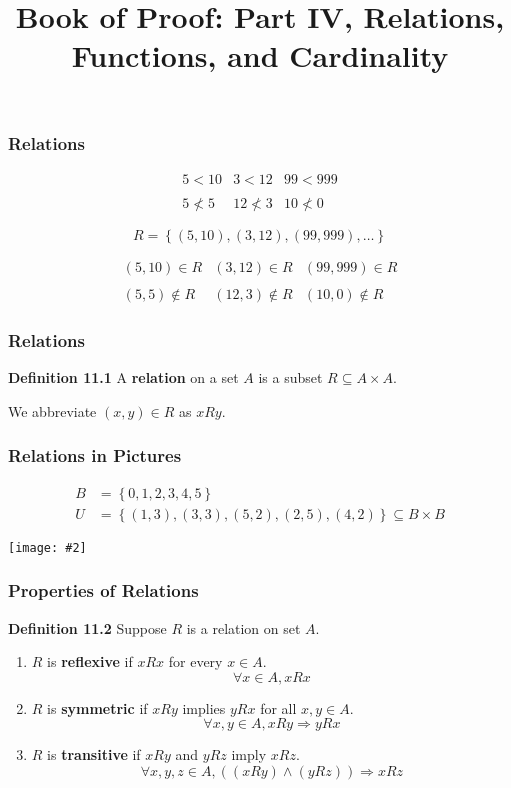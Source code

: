 \documentclass{beamer}
\title{Book of Proof: Part IV, Relations, Functions, and Cardinality}
\newcommand{\set}[1]{\ensuremath{\left\{ #1 \right\}}}
\newcommand{\then}{\ensuremath{\Rightarrow}}
\newcommand{\grf}[2]{\centerline{\texttt{[image: \#2]}}}
\newcommand{\bfr}[1]{\begin{frame}[fragile]\frametitle{{ #1 }}}
\begin{document}
\begin{frame}
\maketitle

\end{frame}

\bfr{Relations}
\[
\begin{array}{ccc}
  5 < 10 & 3 < 12 & 99 < 999 \\\\
  5 \not< 5 & 12\not< 3 & 10 \not< 0
\end{array}
\]

\pause\vfill
\[ R = \set{(5,10), (3,12), (99,999), \ldots} \]

\[
\begin{array}{ccc}
  (5,10)\in R & (3,12)\in R & (99,999)\in R \\\\
  (5,5) \not\in R & (12,3) \not\in R & (10,0)\not\in R
\end{array}
\]


\end{frame}

\bfr{Relations}

{\bf Definition 11.1}  A {\bf relation} on a set $A$ is a subset
$R\subseteq A\times A$.

We abbreviate $(x,y)\in R$ as $xRy$.

\end{frame}


\bfr{Relations in Pictures}

\begin{align*}
  B &=\set{0,1,2,3,4,5} \\
 U &= \set{
  (1,3), (3,3), (5,2), (2,5), (4,2)
} \subseteq B\times B
\end{align*}

\grf{0.5}{relationUonB.png}

\end{frame}

\bfr{Properties of Relations}

{\bf Definition 11.2}  Suppose $R$ is a relation on set $A$.

\begin{enumerate}
\item  $R$ is {\bf reflexive} if $xRx$ for every $x\in A$.
  \[ \forall x\in A, xRx \]

\item $R$ is {\bf symmetric} if $xRy$ implies $yRx$ for all
  $x,y\in A$.
  \[ \forall x,y \in A, xRy \then yRx \]

\item $R$ is {\bf transitive} if $xRy$ and $yRz$ imply $xRz$.
  \[
  \forall x,y,z\in A, ((xRy) \land (yRz)) \then xRz
  \]
\end{enumerate}
\end{frame}
\end{document}
